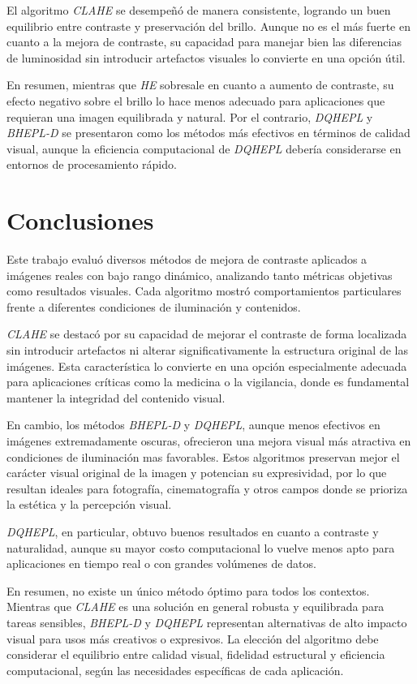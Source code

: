 \documentclass[sigchi]{acmart}
\begin{document}
El algoritmo \emph{CLAHE} se desempeñó de manera consistente, logrando un buen equilibrio
entre contraste y preservación del brillo. Aunque no es el más fuerte en cuanto a la mejora de
contraste, su capacidad para manejar bien las diferencias de luminosidad sin introducir
artefactos visuales lo convierte en una opción útil.

En resumen, mientras que \emph{HE} sobresale en cuanto a aumento de contraste, su efecto
negativo sobre el brillo lo hace menos adecuado para aplicaciones que requieran una imagen
equilibrada y natural. Por el contrario, \emph{DQHEPL} y \emph{BHEPL-D} se presentaron como
los métodos más efectivos en términos de calidad visual, aunque la eficiencia computacional de
\emph{DQHEPL} debería considerarse en entornos de procesamiento rápido.

\section{Conclusiones}
\label{sec:conclusiones}

Este trabajo evaluó diversos métodos de mejora de contraste aplicados a imágenes reales con
bajo rango dinámico, analizando tanto métricas objetivas como resultados visuales. Cada
algoritmo mostró comportamientos particulares frente a diferentes condiciones de iluminación y
contenidos.

\emph{CLAHE} se destacó por su capacidad de mejorar el contraste de forma localizada sin
introducir artefactos ni alterar significativamente la estructura original de las imágenes.
Esta característica lo convierte en una opción especialmente adecuada para aplicaciones
críticas como la medicina o la vigilancia, donde es fundamental mantener la integridad del
contenido visual.

En cambio, los métodos \emph{BHEPL-D} y \emph{DQHEPL}, aunque menos efectivos en imágenes
extremadamente oscuras, ofrecieron una mejora visual más atractiva en condiciones de
iluminación mas favorables.
Estos algoritmos preservan mejor el carácter visual original de la imagen y potencian su
expresividad, por lo que resultan ideales para fotografía, cinematografía y otros campos donde
se prioriza la estética y la percepción visual.

\emph{DQHEPL}, en particular, obtuvo buenos resultados en cuanto a contraste y naturalidad,
aunque su mayor costo computacional lo vuelve menos apto para aplicaciones en tiempo real o con
grandes volúmenes de datos.

En resumen, no existe un único método óptimo para todos los contextos. Mientras que
\emph{CLAHE} es una solución en general robusta y equilibrada para tareas sensibles,
\emph{BHEPL-D} y \emph{DQHEPL} representan alternativas de alto impacto visual para usos más
creativos o expresivos. La elección del algoritmo debe considerar el equilibrio entre calidad
visual, fidelidad estructural y eficiencia computacional, según las necesidades específicas de
cada aplicación.
\end{document}
